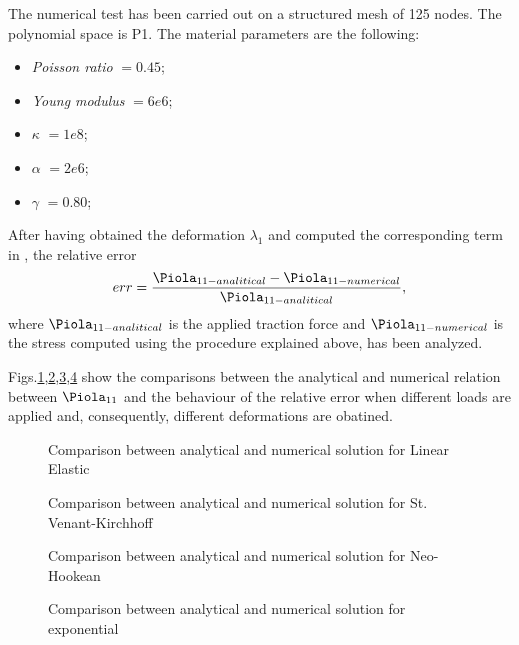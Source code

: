 The numerical test has been carried out on a structured mesh of 125 nodes. The polynomial space is P1. The material parameters are the following:
\begin{itemize}
  \item \textit{Poisson ratio} $= 0.45$;
  \item \textit{Young modulus} $= 6e6$;
  \item $\kappa$ $=1e8$; 
  \item $\alpha$ $=2e6$; 
  \item $\gamma$ $=0.80$; 
\end{itemize}
After having obtained the deformation $\lambda_1$ and computed the corresponding term in \Piola, the relative error
\begin{equation}
  err = \displaystyle \frac{\Piola_{11-analitical}-\Piola_{11-numerical}}{\Piola_{11-analitical}},
\end{equation}
where $\Piola_{11-analitical}$ is the applied traction force and $\Piola_{11-numerical}$ is the stress computed using the procedure explained above, has been analyzed.

Figs.\ref{fig:errLE},\ref{fig:errSVK},\ref{fig:errNH},\ref{fig:errEXP} show the comparisons between the analytical and numerical relation between $\Piola_{11}$ and the behaviour of the relative error when different loads are applied and, consequently, different deformations are obatined.

\begin{figure}[h!]
\centering
{}
\caption{Comparison between analytical and numerical solution for Linear Elastic}
\label{fig:errLE}
\end{figure}

\begin{figure}[h!]
\centering
{}
\caption{Comparison between analytical and numerical solution for St. Venant-Kirchhoff}
\label{fig:errSVK}
\end{figure}

\begin{figure}[h!]
\centering
{}
\caption{Comparison between analytical and numerical solution for Neo-Hookean}
\label{fig:errNH}
\end{figure}

\begin{figure}[h!]
\centering
{}
\caption{Comparison between analytical and numerical solution for exponential}
\label{fig:errEXP}
\end{figure}

